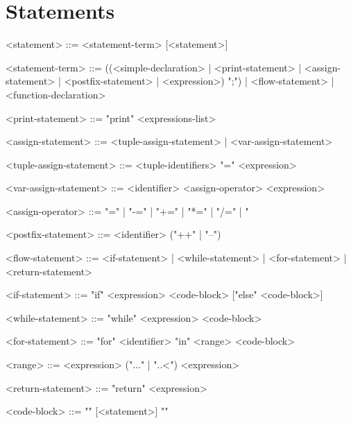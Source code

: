 \documentclass{article}
\begin{document}
\section{Statements}
\begin{grammar}
<statement> ::= <statement-term> [<statement>]

<statement-term> ::= ((<simple-declaration> | <print-statement> | <assign-statement> | <postfix-statement> | <expression>) ";") | <flow-statement> | <function-declaration>

<print-statement> ::= "print" <expressions-list>

<assign-statement> ::= <tuple-assign-statement> | <var-assign-statement>

<tuple-assign-statement> ::= <tuple-identifiers> "=" <expression>

<var-assign-statement> ::= <identifier> <assign-operator> <expression>

<assign-operator> ::= "=" | "-=" | "+=" | "*=" | "/=" | "%

<postfix-statement> ::= <identifier> ("++" | "--")

<flow-statement> ::= <if-statement> | <while-statement> | <for-statement> | <return-statement>

<if-statement> ::= "if" <expression> <code-block> ["else" <code-block>]

<while-statement> ::= "while" <expression> <code-block>

<for-statement> ::= "for" <identifier> "in" <range> <code-block>

<range> ::= <expression> ("..." | "..<") <expression>

<return-statement> ::= "return" <expression>

<code-block> ::= "{" [<statement>] "}"
\end{grammar}
\end{document}
